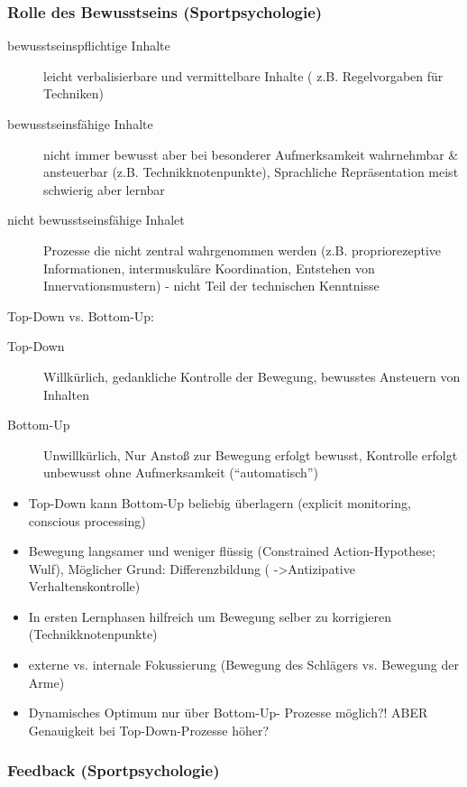 \subsubsection*{Rolle des Bewusstseins (Sportpsychologie)}

\begin{description}
    \item [bewusstseinspflichtige Inhalte] leicht verbalisierbare und vermittelbare Inhalte ( z.B. Regelvorgaben für Techniken)
    \item [bewusstseinsfähige Inhalte] nicht immer bewusst aber bei besonderer Aufmerksamkeit wahrnehmbar \& ansteuerbar (z.B. Technikknotenpunkte), Sprachliche Repräsentation meist schwierig aber lernbar
    \item [nicht bewusstseinsfähige Inhalet] Prozesse die nicht zentral wahrgenommen werden (z.B. propriorezeptive Informationen, intermuskuläre Koordination, Entstehen von Innervationsmustern) - nicht Teil der technischen Kenntnisse
\end{description}

Top-Down vs. Bottom-Up:
\begin{description}
    \item [Top-Down] Willkürlich, gedankliche Kontrolle der Bewegung, bewusstes Ansteuern von Inhalten
    \item [Bottom-Up] Unwillkürlich, Nur Anstoß zur Bewegung erfolgt bewusst, Kontrolle erfolgt unbewusst ohne Aufmerksamkeit (``automatisch'')
\end{description}
\begin{itemize}
    \item Top-Down kann Bottom-Up beliebig überlagern (explicit monitoring, conscious processing)
    \item Bewegung langsamer und weniger flüssig (Constrained Action-Hypothese; Wulf), Möglicher Grund: Differenzbildung ( ->Antizipative Verhaltenskontrolle)
    \item In ersten Lernphasen hilfreich um Bewegung selber zu korrigieren (Technikknotenpunkte)
    \item externe vs. internale Fokussierung (Bewegung des Schlägers vs. Bewegung der Arme)
    \item Dynamisches Optimum nur über Bottom-Up- Prozesse möglich?! ABER Genauigkeit bei Top-Down-Prozesse höher?
\end{itemize}

\subsubsection*{Feedback (Sportpsychologie)}

